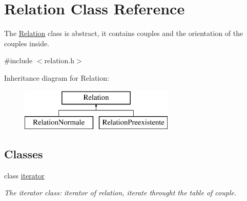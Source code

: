 \hypertarget{class_relation}{}\section{Relation Class Reference}
\label{class_relation}


The \hyperlink{class_relation}{Relation} class is abstract, it contains couples and the orientation of the couples inside.  




{\ttfamily \#include $<$relation.\+h$>$}

Inheritance diagram for Relation\+:\begin{figure}[H]
\begin{center}
\leavevmode
\includegraphics[height=2.000000cm]{class_relation}
\end{center}
\end{figure}
\subsection*{Classes}
\begin{DoxyCompactItemize}
\item 
class \hyperlink{class_relation_1_1iterator}{iterator}
\begin{DoxyCompactList}\small\item\em The iterator class\+: iterator of relation, iterate throught the table of couple. \end{DoxyCompactList}\end{DoxyCompactItemize}
